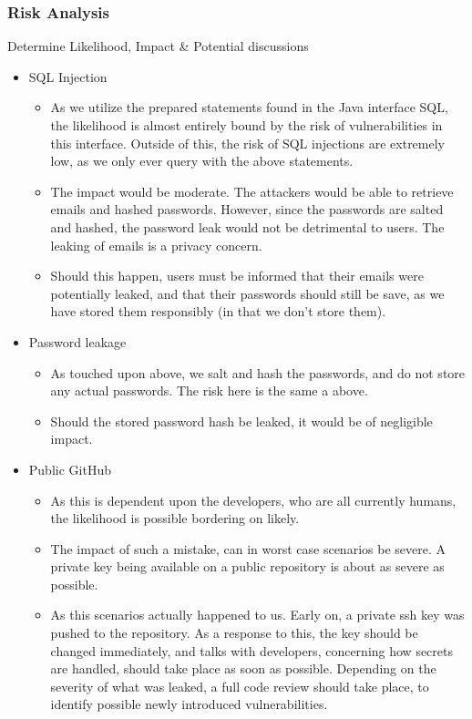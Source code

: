 \documentclass{article}
\begin{document}
\subsubsection{\Large Risk Analysis}

{\large Determine Likelihood, Impact \& Potential discussions}

\begin{itemize}
    \item SQL Injection
    \begin{itemize}
        \item As we utilize the prepared statements found in the Java interface SQL, the likelihood is almost entirely bound by the risk of vulnerabilities in this interface. Outside of this, the risk of SQL injections are extremely low, as we only ever query with the above statements.
        \item The impact would be moderate. The attackers would be able to retrieve emails and hashed passwords. However, since the passwords are salted and hashed, the password leak would not be detrimental to users. The leaking of emails is a privacy concern.
        \item Should this happen, users must be informed that their emails were potentially leaked, and that their passwords should still be save, as we have stored them responsibly (in that we don't store them).
    \end{itemize}
    \item Password leakage
    \begin{itemize}
        \item As touched upon above, we salt and hash the passwords, and do not store any actual passwords. The risk here is the same a above.
        \item Should the stored password hash be leaked, it would be of negligible impact.
    \end{itemize}
    \item Public GitHub
    \begin{itemize}
        \item As this is dependent upon the developers, who are all currently humans, the likelihood is possible bordering on likely.
        \item The impact of such a mistake, can in worst case scenarios be severe. A private key being available on a public repository is about as severe as possible.
        \item As this scenarios actually happened to us. Early on, a private ssh key was pushed to the repository. As a response to this, the key should be changed immediately, and talks with developers, concerning how secrets are handled, should take place as soon as possible. Depending on the severity of what was leaked, a full code review should take place, to identify possible newly introduced vulnerabilities.

\end{itemize}
\end{itemize}
\end{document}
